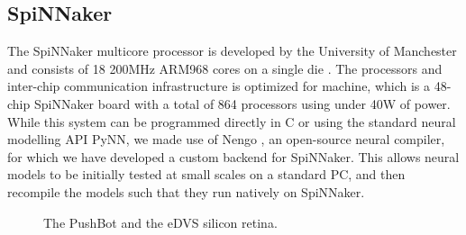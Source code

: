 \documentclass[conference]{IEEEtran}
\begin{document}
\subsection{SpiNNaker}

The SpiNNaker multicore processor is developed by the University of Manchester and consists of 18 200MHz ARM968 cores on a single die \cite{furber2007neural, furber2014spinnaker}. The processors and inter-chip communication infrastructure is optimized for machine, which is a 48-chip SpiNNaker board with a total of 864 processors using under 40W of power. While this system can be programmed directly in C or using the standard neural modelling API PyNN, we made use of Nengo \cite{bekolay_nengo2014}, an open-source neural compiler, for which we have developed a custom backend for SpiNNaker. This allows neural models to be initially tested at small scales on a standard PC, and then recompile the models such that they
run natively on SpiNNaker.


\begin{figure}[!t]
\centering
\caption{The PushBot and the eDVS silicon retina.}
\label{fig_sim}
\end{figure}
\end{document}
